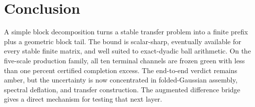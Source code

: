 \documentclass[11pt]{article}
\theoremstyle{definition}
\begin{document}
\section{Conclusion}

A simple block decomposition turns a stable transfer problem into a finite
prefix plus a geometric block tail.  The bound is scalar-sharp, eventually
available for every stable finite matrix, and well suited to exact-dyadic
ball arithmetic.  On the five-scale production family, all ten terminal
channels are frozen green with less than one percent certified completion
excess.  The end-to-end verdict remains amber, but the uncertainty is now
concentrated in folded-Gaussian assembly, spectral deflation, and transfer
construction.  The augmented difference bridge gives a direct mechanism for
testing that next layer.



\end{document}

